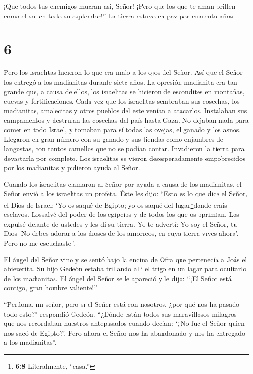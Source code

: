  ¡Que todos tus enemigos mueran así, Señor! ¡Pero que los
que te aman brillen como el sol en todo su esplendor!'' La tierra estuvo
en paz por cuarenta años.

\hypertarget{section-5}{%
\section{6}\label{section-5}}

 Pero los israelitas hicieron lo que era malo a los ojos del
Señor. Así que el Señor los entregó a los madianitas durante siete años.
 La opresión madianita era tan grande que, a causa de ellos,
los israelitas se hicieron de escondites en montañas, cuevas y
fortificaciones.  Cada vez que los israelitas sembraban sus
cosechas, los madianitas, amalecitas y otros pueblos del este venían a
atacarlos.  Instalaban sus campamentos y destruían las
cosechas del país hasta Gaza. No dejaban nada para comer en todo Israel,
y tomaban para sí todas las ovejas, el ganado y los asnos. 
Llegaron en gran número con su ganado y sus tiendas como enjambres de
langostas, con tantos camellos que no se podían contar. Invadieron la
tierra para devastarla por completo.  Los israelitas se
vieron desesperadamente empobrecidos por los madianitas y pidieron ayuda
al Señor.

 Cuando los israelitas clamaron al Señor por ayuda a causa
de los madianitas,  el Señor envió a los israelitas un
profeta. Éste les dijo: ``Esto es lo que dice el Señor, el Dios de
Israel: `Yo os saqué de Egipto; yo os saqué del lugar\footnote{\textbf{6:8}
  Literalmente, ``casa.''}donde erais esclavos.  Lossalvé
del poder de los egipcios y de todos los que os oprimían. Los expulsé
delante de ustedes y les di su tierra.  Yo te advertí: Yo
soy el Señor, tu Dios. No debes adorar a los dioses de los amorreos, en
cuya tierra vives ahora'. Pero no me escuchaste''.

 El ángel del Señor vino y se sentó bajo la encina de Ofra
que pertenecía a Joás el abiezerita. Su hijo Gedeón estaba trillando
allí el trigo en un lagar para ocultarlo de los madianitas.
 El ángel del Señor se le apareció y le dijo: ``¡El Señor
está contigo, gran hombre valiente!''

 ``Perdona, mi señor, pero si el Señor está con nosotros,
¿por qué nos ha pasado todo esto?'' respondió Gedeón. ``¿Dónde están
todos sus maravillosos milagros que nos recordaban nuestros antepasados
cuando decían: `¿No fue el Señor quien nos sacó de Egipto?'. Pero ahora
el Señor nos ha abandonado y nos ha entregado a los madianitas''.

